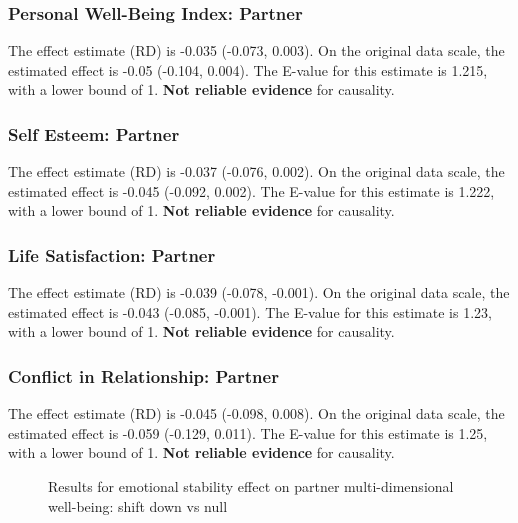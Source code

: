 \documentclass[
  singlecolumn]{article}
\begin{document}
\subsubsection{Personal Well-Being Index:
Partner}\label{personal-well-being-index-partner-4}

The effect estimate (RD) is -0.035 (-0.073, 0.003). On the original data
scale, the estimated effect is -0.05 (-0.104, 0.004). The E-value for
this estimate is 1.215, with a lower bound of 1. \textbf{Not reliable
evidence} for causality.

\subsubsection{Self Esteem: Partner}\label{self-esteem-partner-4}

The effect estimate (RD) is -0.037 (-0.076, 0.002). On the original data
scale, the estimated effect is -0.045 (-0.092, 0.002). The E-value for
this estimate is 1.222, with a lower bound of 1. \textbf{Not reliable
evidence} for causality.

\subsubsection{Life Satisfaction:
Partner}\label{life-satisfaction-partner-4}

The effect estimate (RD) is -0.039 (-0.078, -0.001). On the original
data scale, the estimated effect is -0.043 (-0.085, -0.001). The E-value
for this estimate is 1.23, with a lower bound of 1. \textbf{Not reliable
evidence} for causality.

\subsubsection{Conflict in Relationship:
Partner}\label{conflict-in-relationship-partner-4}

The effect estimate (RD) is -0.045 (-0.098, 0.008). On the original data
scale, the estimated effect is -0.059 (-0.129, 0.011). The E-value for
this estimate is 1.25, with a lower bound of 1. \textbf{Not reliable
evidence} for causality.

\begin{figure}


\caption{\label{fig-results-emotional-stability-partner-down}Results for
emotional stability effect on partner multi-dimensional well-being:
shift down vs null}

\end{figure}%
\end{document}
